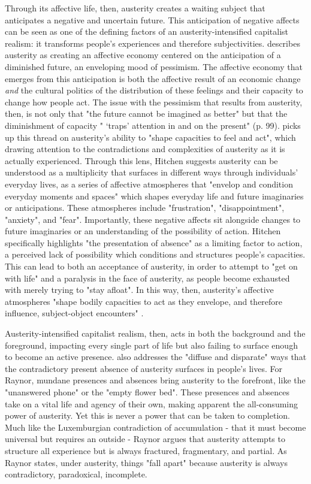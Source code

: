 Through its affective life, then, austerity creates a waiting subject that anticipates a negative and uncertain future. This anticipation of negative affects can be seen as one of the defining factors of an austerity-intensified capitalist realism: it transforms people's experiences and therefore subjectivities. \citet{coleman_austerity_2016} describes austerity as creating an affective economy centered on the anticipation of a diminished future, an enveloping mood of pessimism. The affective economy that emerges from this anticipation is both the affective result of an economic change \textit{and} the cultural politics of the distribution of these feelings and their capacity to change how people act. The issue with the pessimism that results from austerity, then, is not only that "the future cannot be imagined as better" but that the diminishment of capacity " `traps' attention in and on the present" (p. 99).  \citet[p. 102]{hitchen_living_2016}  picks up this thread on austerity's ability to "shape  capacities to feel and act", which drawing attention to the contradictions and complexities of austerity as it is actually experienced. Through this lens, Hitchen suggests austerity can be understood as a multiplicity that surfaces in different ways through individuals' everyday lives, as a series of affective atmospheres that "envelop and condition everyday moments and spaces" which shapes everyday life and future imaginaries or anticipations. These atmospheres include "frustration", "disappointment", "anxiety", and "fear". Importantly, these negative affects sit alongside changes to future imaginaries or an understanding of the possibility of action. Hitchen specifically highlights "the presentation of absence" as a limiting factor to action, a perceived lack of possibility which conditions and structures people's capacities. This can lead to both an acceptance of austerity, in order to attempt to "get on with life" and a paralysis in the face of austerity, as people become exhausted with merely trying to "stay afloat". In this way, then, austerity's affective atmospheres "shape bodily capacities to act as they envelope, and therefore influence, subject-object encounters" \citep[p. 117]{hitchen_living_2016}.

Austerity-intensified capitalist realism, then, acts in both the background and the foreground, impacting every single part of life but also failing to surface enough to become an active presence. \citet[p. 195]{raynor_dramatising_2017} also addresses the "diffuse and disparate" ways that the contradictory present absence of austerity surfaces in people's lives. For Raynor, mundane presences and absences bring austerity to the forefront, like the "unanswered phone" or the "empty flower bed". These presences and absences take on a vital life and agency of their own, making apparent the all-consuming power of austerity. Yet this is never a power that can be taken to completion. Much like the Luxemburgian contradiction of accumulation - that it must become universal but requires an outside - Raynor argues that austerity attempts to structure all experience but is always fractured, fragmentary, and partial. As Raynor states, under austerity, things "fall apart" because austerity is always contradictory, paradoxical, incomplete.

